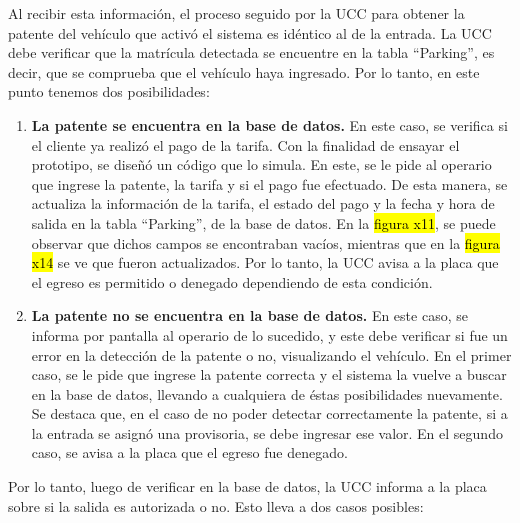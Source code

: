 Al recibir esta información, el proceso seguido por la UCC para obtener la patente del vehículo que activó el sistema es idéntico al de la entrada. La UCC debe verificar que la matrícula detectada se encuentre en la tabla ``Parking'', es decir, que se comprueba que el vehículo haya ingresado. Por lo tanto, en este punto tenemos dos posibilidades:

\begin{enumerate}
	\item \textbf{La patente se encuentra en la base de datos.} En este caso, se verifica si el cliente ya realizó el pago de la tarifa. Con la finalidad de ensayar el prototipo, se diseñó un código que lo simula. En este, se le pide al operario que ingrese la patente, la tarifa y si el pago fue efectuado. De esta manera, se actualiza la información de la tarifa, el estado del pago y la fecha y hora de salida en la tabla “Parking”, de la base de datos. En la \hl{figura x11}, se puede observar que dichos campos se encontraban vacíos, mientras que en la \hl{figura x14} se ve que fueron actualizados. Por lo tanto, la UCC avisa a la placa que el egreso es permitido o denegado dependiendo de esta condición.
	
	\item \textbf{La patente no se encuentra en la base de datos.} En este caso, se informa por pantalla al operario de lo sucedido, y este debe verificar si fue un error en la detección de la patente o no, visualizando el vehículo. En el primer caso, se le pide que ingrese la patente correcta y el sistema la vuelve a buscar en la base de datos, llevando a cualquiera de éstas posibilidades nuevamente. Se destaca que, en el caso de no poder detectar correctamente la patente, si a la entrada se asignó una provisoria, se debe ingresar ese valor. En el segundo caso, se avisa a la placa que el egreso fue denegado.
	\end{enumerate}


Por lo tanto, luego de verificar en la base de datos, la UCC informa a la placa sobre si la salida es autorizada o no. Esto lleva a dos casos posibles:


